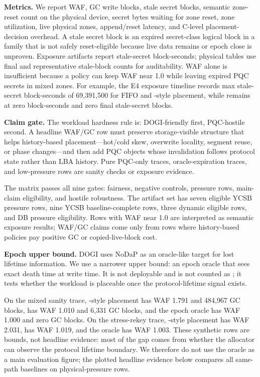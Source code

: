 \noindent\textbf{Metrics.}
We report WAF, GC write blocks, stale secret blocks, semantic zone-reset count on the physical device, secret bytes waiting for zone reset, zone utilization, live physical zones, append/reset latency, and C-level placement-decision overhead.  A stale secret block is an expired secret-class logical block in a family that is not safely reset-eligible because live data remains or epoch close is unproven.  Exposure artifacts report stale-secret block-seconds; physical tables use final and representative stale-block counts for auditability.  WAF alone is insufficient because a policy can keep WAF near 1.0 while leaving expired PQC secrets in mixed zones.
For example, the E4 exposure timeline records max stale-secret block-seconds of 69,391,500 for FIFO and \dogi-style placement, while \system remains at zero block-seconds and zero final stale-secret blocks.

\noindent\textbf{Claim gate.}
The workload hardness rule is: DOGI-friendly first, PQC-hostile second.  A headline WAF/GC row must preserve storage-visible structure that helps history-based placement---hot/cold skew, overwrite locality, segment reuse, or phase changes---and then add PQC objects whose invalidation follows protocol state rather than LBA history.  Pure PQC-only traces, oracle-expiration traces, and low-pressure rows are sanity checks or exposure evidence.

The matrix passes all nine gates: fairness, negative controls, pressure rows, main-claim eligibility, and hostile robustness.  The artifact set has seven eligible YCSB pressure rows, nine YCSB baseline-complete rows, three dynamic eligible rows, and DB pressure eligibility.  Rows with WAF near 1.0 are interpreted as semantic exposure results; WAF/GC claims come only from rows where history-based policies pay positive GC or copied-live-block cost.

\noindent\textbf{Epoch upper bound.}
DOGI uses NoDaP as an oracle-like target for lost lifetime information.  We use a narrower upper bound: an epoch oracle that sees exact death time at write time.  It is not deployable and is not counted as \system; it tests whether the workload is placeable once the protocol-lifetime signal exists.

On the mixed sanity trace, \dogi-style placement has WAF 1.791 and 484,967 GC blocks, \system has WAF 1.010 and 6,331 GC blocks, and the epoch oracle has WAF 1.000 and zero GC blocks.  On the stress-rekey trace, \dogi-style placement has WAF 2.031, \system has WAF 1.019, and the oracle has WAF 1.003.  These synthetic rows are bounds, not headline evidence: most of the gap comes from whether the allocator can observe the protocol lifetime boundary.  We therefore do not use the oracle as a main evaluation figure; the plotted headline evidence below compares all same-path baselines on physical-\zns pressure rows.

